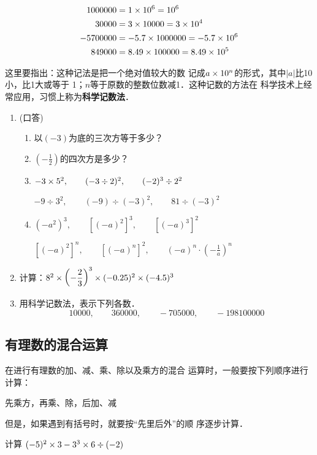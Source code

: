\begin{solution}
	\[\begin{split}
	1000000 &=1\times 10^6=10^6\\ 
	30000  &=3\times 10000=3\times 10^4\\
	-5700000 &=-5.7\times 1000000=-5.7\times 10^6\\
	849000    &=8.49\times 100000=8.49\times 10^5
	\end{split}\]
\end{solution}

这里要指出：这种记法是把一个绝对值较大的数
记成$a\times10^n$的形式，其中$|a|$比10小，比1大或等于
1；$n$等于原数的整数位数减1．这种记数的方法在
科学技术上经常应用，习惯上称为\textbf{科学记数法}．


\begin{ex}
	\begin{enumerate}
		\item (口答)
		\begin{enumerate}
			\item 以$(- 3)$为底的三次方等于多少？
			\item $\left(-\frac{1}{2}\right)$的四次方是多少？
			\item $-3\times 5^2,\qquad (-3\div 2)^2,\qquad (-2)^3\div 2^2$
			
			$-9\div 3^2,\qquad (-9)\div (-3)^2,\qquad 81\div (-3)^2$
			\item $(-a^2)^3,\qquad [(-a)^2]^3,\qquad [(-a)^3]^2$
			
			$[(-a)^2]^n,\qquad [(-a)^n]^2,\qquad (-a)^n\cdot \left(-\frac{1}{a}\right)^n$
		\end{enumerate}   
		\item 计算：$8^2\times \left(-\dfrac{2}{3}\right)^3\times(-0.25)^2\times (-4.5)^3$
		\item 用科学记数法，表示下列各数．
		\[10000,\qquad 360000,\qquad -705000,\qquad -198100000  \]
	\end{enumerate}
\end{ex}

\subsection{有理数的混合运算}
在进行有理数的加、减、乘、除以及乘方的混合
运算时，一般要按下列顺序进行计算：
\begin{center}
	先乘方，再乘、除，后加、减  
\end{center}
但是，如果遇到有括号时，就要按“先里后外”的顺
序逐步计算．




\begin{example}
	计算 $(-5)^2\times 3-3^3\times 6\div (-2)$
\end{example}

